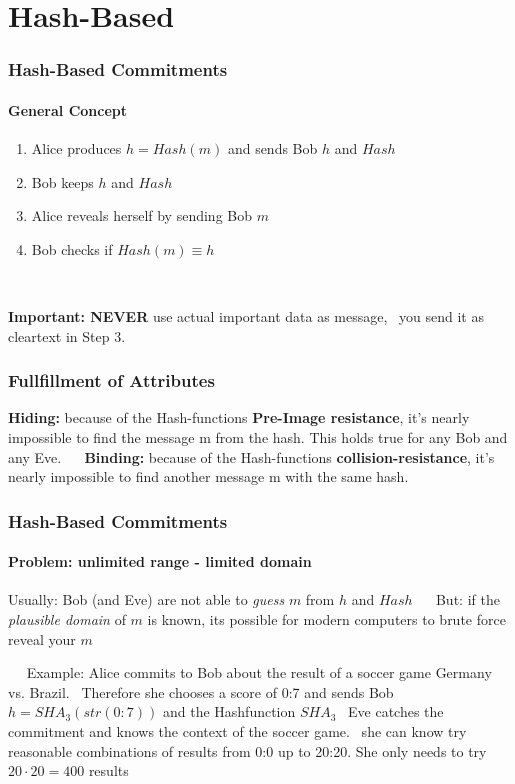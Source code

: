 \section{Hash-Based}
\begin{frame}
	\frametitle{Hash-Based Commitments}
	\framesubtitle{General Concept}
	\begin{LARGE}
		\begin{enumerate}
			\item Alice produces $h = Hash(m)$ and sends Bob $h$ and $Hash$
			\item Bob keeps $h$ and $Hash$
			\item Alice reveals herself by sending Bob $m$
			\item Bob checks if $Hash(m) \equiv h$
		\end{enumerate}
	\end{LARGE}
	 ~\newline  ~\newline 
	 \begin{center}
	 	\textbf{Important: NEVER} use actual important data as message,  ~\newline  you send it as cleartext in Step 3. 
	 \end{center}
\end{frame}

\begin{frame}
	\frametitle{Fullfillment of Attributes}
	\begin{LARGE}
	\textbf{Hiding:} because of the Hash-functions \textbf{Pre-Image resistance}, it's nearly impossible to find the message m from the hash. This holds true for any Bob and any Eve. ~\newline ~\newline
	\textbf{Binding:} because of the Hash-functions \textbf{collision-resistance}, it's nearly impossible to find another message m with the same hash.
	\end{LARGE}
\end{frame}

\begin{frame}
	\frametitle{Hash-Based Commitments}
	\framesubtitle{Problem: unlimited range - limited domain}
	Usually: Bob (and Eve) are not able to \textit{guess} $m$ from $h$ and $Hash$
	~\newline ~\newline
	But: if the \textit{plausible domain} of $m$ is known, its possible for modern computers to brute force reveal your $m$ 
	
	~\newline ~\newline 
	Example: Alice commits to Bob about the result of a soccer game Germany vs. Brazil. ~\newline Therefore she chooses a score of 0:7 and sends Bob $h = SHA_3(str(0:7))$ and the Hashfunction $SHA_3$ ~\newline Eve catches the commitment and knows the context of the soccer game. ~\newline she can know try reasonable combinations of results from 0:0 up to 20:20. She only needs to try $20 \cdot 20 = 400$ results 
\end{frame}

